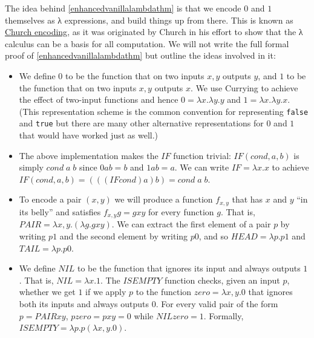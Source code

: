 The idea behind \cref{enhancedvanillalambdathm} is that we encode \(0\)
and \(1\) themselves as λ expressions, and build things up from there.
This is known as \href{https://goo.gl/QZKM9M}{Church encoding}, as it
was originated by Church in his effort to show that the λ calculus can
be a basis for all computation. We will not write the full formal proof
of \cref{enhancedvanillalambdathm} but outline the ideas involved in it:

\begin{itemize}
\item
  We define \(0\) to be the function that on two inputs \(x,y\) outputs
  \(y\), and \(1\) to be the function that on two inputs \(x,y\) outputs
  \(x\). We use Currying to achieve the effect of two-input functions
  and hence \(0 = \lambda x. \lambda y.y\) and
  \(1 = \lambda x.\lambda y.x\). (This representation scheme is the
  common convention for representing \texttt{false} and \texttt{true}
  but there are many other alternative representations for \(0\) and
  \(1\) that would have worked just as well.)
\item
  The above implementation makes the \(\ensuremath{\mathit{IF}}\)
  function trivial: \(\ensuremath{\mathit{IF}}(cond,a,b)\) is simply
  \(cond \; a\; b\) since \(0ab = b\) and \(1ab = a\). We can write
  \(\ensuremath{\mathit{IF}} = \lambda x.x\) to achieve
  \(\ensuremath{\mathit{IF}}(cond,a,b) = (((\ensuremath{\mathit{IF}} cond) a) b) = cond \; a \; b\).
\item
  To encode a pair \((x,y)\) we will produce a function \(f_{x,y}\) that
  has \(x\) and \(y\) ``in its belly'' and satisfies
  \(f_{x,y}g = g x y\) for every function \(g\). That is,
  \(\ensuremath{\mathit{PAIR}} = \lambda x,y. \left(\lambda g. gxy\right)\).
  We can extract the first element of a pair \(p\) by writing \(p1\) and
  the second element by writing \(p0\), and so
  \(\ensuremath{\mathit{HEAD}} = \lambda p. p1\) and
  \(\ensuremath{\mathit{TAIL}} = \lambda p. p0\).
\item
  We define \(\ensuremath{\mathit{NIL}}\) to be the function that
  ignores its input and always outputs \(1\). That is,
  \(\ensuremath{\mathit{NIL}} = \lambda x.1\). The
  \(\ensuremath{\mathit{ISEMPTY}}\) function checks, given an input
  \(p\), whether we get \(1\) if we apply \(p\) to the function
  \(zero = \lambda x,y.0\) that ignores both its inputs and always
  outputs \(0\). For every valid pair of the form
  \(p = \ensuremath{\mathit{PAIR}} x y\), \(p zero = p x y = 0\) while
  \(\ensuremath{\mathit{NIL}} zero=1\). Formally,
  \(\ensuremath{\mathit{ISEMPTY}} = \lambda p. p (\lambda x,y.0)\).
\end{itemize}

